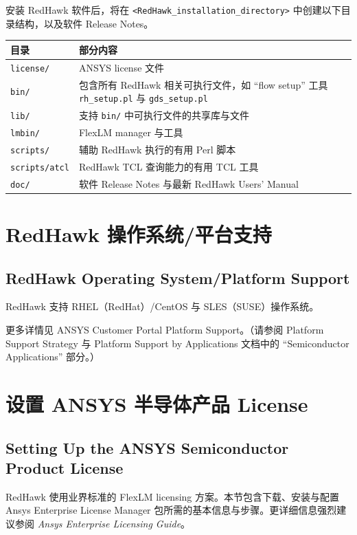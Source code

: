 安装 RedHawk 软件后，将在 \texttt{<RedHawk\_installation\_directory>} 中创建以下目录结构，以及软件 Release Notes。

\begin{center}
\begin{tabular}{ll}
\toprule
目录 & 部分内容 \\
\midrule
\texttt{license/} & ANSYS license 文件 \\
\texttt{bin/} & 包含所有 RedHawk 相关可执行文件，如 ``flow setup'' 工具 \texttt{rh\_setup.pl} 与 \texttt{gds\_setup.pl} \\
\texttt{lib/} & 支持 \texttt{bin/} 中可执行文件的共享库与文件 \\
\texttt{lmbin/} & FlexLM manager 与工具 \\
\texttt{scripts/} & 辅助 RedHawk 执行的有用 Perl 脚本 \\
\texttt{scripts/atcl} & RedHawk TCL 查询能力的有用 TCL 工具 \\
\texttt{doc/} & 软件 Release Notes 与最新 RedHawk Users' Manual \\
\bottomrule
\end{tabular}
\end{center}

\section{RedHawk 操作系统/平台支持}
\subsection*{RedHawk Operating System/Platform Support}

RedHawk 支持 RHEL（RedHat）/CentOS 与 SLES（SUSE）操作系统。

更多详情见 ANSYS Customer Portal Platform Support。（请参阅 Platform Support Strategy 与 Platform Support by Applications 文档中的 ``Semiconductor Applications'' 部分。）

\section{设置 ANSYS 半导体产品 License}
\subsection*{Setting Up the ANSYS Semiconductor Product License}

RedHawk 使用业界标准的 FlexLM licensing 方案。本节包含下载、安装与配置 Ansys Enterprise License Manager 包所需的基本信息与步骤。更详细信息强烈建议参阅 \textit{Ansys Enterprise Licensing Guide}。

